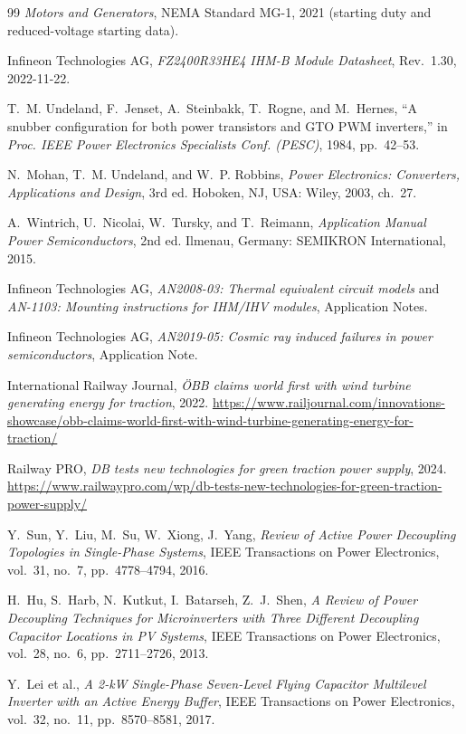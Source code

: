 \begin{thebibliography}{99}
 \emph{Motors and Generators}, NEMA Standard MG-1, 2021 (starting duty and reduced-voltage starting data).

 Infineon Technologies AG, \emph{FZ2400R33HE4 IHM-B Module Datasheet}, Rev.~1.30, 2022-11-22.

 T.~M. Undeland, F.~Jenset, A.~Steinbakk, T.~Rogne, and M.~Hernes, ``A snubber configuration for both power transistors and GTO PWM inverters,'' in \emph{Proc. IEEE Power Electronics Specialists Conf. (PESC)}, 1984, pp.~42--53.

 N.~Mohan, T.~M. Undeland, and W.~P. Robbins, \emph{Power Electronics: Converters, Applications and Design}, 3rd ed. Hoboken, NJ, USA: Wiley, 2003, ch.~27.

 A.~Wintrich, U.~Nicolai, W.~Tursky, and T.~Reimann, \emph{Application Manual Power Semiconductors}, 2nd ed. Ilmenau, Germany: SEMIKRON International, 2015.

 Infineon Technologies AG, \emph{AN2008-03: Thermal equivalent circuit models} and \emph{AN-1103: Mounting instructions for IHM/IHV modules}, Application Notes.

 Infineon Technologies AG, \emph{AN2019-05: Cosmic ray induced failures in power semiconductors}, Application Note.

 International Railway Journal, \emph{ÖBB claims world first with wind turbine generating energy for traction}, 2022. \url{https://www.railjournal.com/innovations-showcase/obb-claims-world-first-with-wind-turbine-generating-energy-for-traction/}

 Railway PRO, \emph{DB tests new technologies for green traction power supply}, 2024. \url{https://www.railwaypro.com/wp/db-tests-new-technologies-for-green-traction-power-supply/}

 Y.~Sun, Y.~Liu, M.~Su, W.~Xiong, J.~Yang, \emph{Review of Active Power Decoupling Topologies in Single-Phase Systems}, IEEE Transactions on Power Electronics, vol.~31, no.~7, pp.~4778--4794, 2016.

 H.~Hu, S.~Harb, N.~Kutkut, I.~Batarseh, Z.~J.~Shen, \emph{A Review of Power Decoupling Techniques for Microinverters with Three Different Decoupling Capacitor Locations in PV Systems}, IEEE Transactions on Power Electronics, vol.~28, no.~6, pp.~2711--2726, 2013.

 Y.~Lei et al., \emph{A 2-kW Single-Phase Seven-Level Flying Capacitor Multilevel Inverter with an Active Energy Buffer}, IEEE Transactions on Power Electronics, vol.~32, no.~11, pp.~8570--8581, 2017.


\end{thebibliography}
